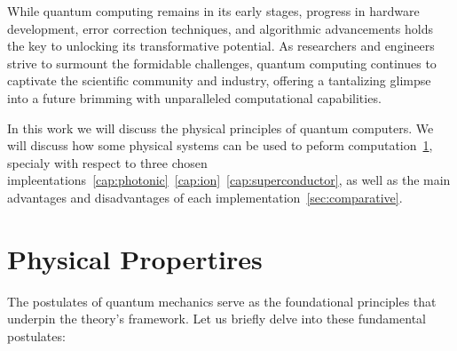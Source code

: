 \documentclass[
  journal=largetwo,
  year=2023,
]{cup-journal}
\begin{document}
While quantum computing remains in its early stages, progress in hardware development, error correction techniques, and algorithmic advancements holds the key to unlocking its transformative potential. As researchers and engineers strive to surmount the formidable challenges, quantum computing continues to captivate the scientific community and industry, offering a tantalizing glimpse into a future brimming with unparalleled computational capabilities.

In this work we will discuss the physical principles of quantum computers. We will discuss how some physical systems can be used to peform computation~\ref{sec:physical_properties}, specialy with respect to three chosen impleentations~\ref{cap:photonic}~\ref{cap:ion}~\ref{cap:superconductor}, as well as the main advantages and disadvantages of each implementation~\ref{sec:comparative}.


\section{Physical Propertires}
\label{sec:physical_properties}

The postulates of quantum mechanics serve as the foundational principles that underpin the theory's framework. Let us briefly delve into these fundamental postulates\autocite{cohentannoudji_1977_quantum}:
\end{document}

